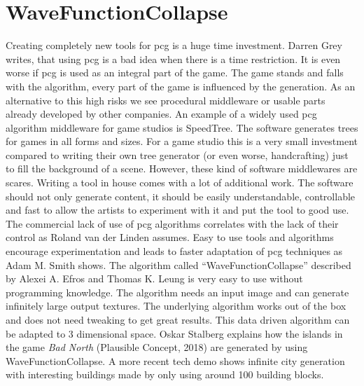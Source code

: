 \documentclass[10pt,a4paper]{article}
\begin{document}
\section{WaveFunctionCollapse}
\begin{multicols}{2}
Creating completely new tools for \gls{pcg} is a huge time investment. Darren Grey writes, that using \gls{pcg} is a bad idea when there is a time restriction\citep[p.~6]{Short:2017:PGG:3161477}. It is even worse if \gls{pcg} is used as an integral part of the game. The game stands and falls with the algorithm, every part of the game is influenced by the generation. As an alternative to this high risks we see procedural middleware or usable parts already developed by other companies. An example of a widely used \gls{pcg} algorithm middleware for game studios is SpeedTree\cite{SpeedTree}. The software generates trees for games in all forms and sizes. For a game studio this is a very small investment compared to writing their own tree generator (or even worse, handcrafting) just to fill the background of a scene. However, these kind of software middlewares are scares. Writing a tool in house comes with a lot of additional work. The software should not only generate content, it should be easily understandable, controllable and fast to allow the artists to experiment with it and put the tool to good use. The commercial lack of use of \gls{pcg} algorithms correlates with the lack of their control as Roland van der Linden assumes\cite{VanderLinden2014}. Easy to use tools and algorithms encourage experimentation and leads to faster adaptation of \gls{pcg} techniques as Adam M. Smith shows\cite{Karth2017}. The algorithm called “WaveFunctionCollapse” described by Alexei A. Efros and Thomas K. Leung is very easy to use without programming knowledge\cite{Efros1999}. The algorithm needs an input image and can generate infinitely large output textures. The underlying algorithm works out of the box and does not need tweaking to get great results. This data driven algorithm can be adapted to 3 dimensional space. Oskar Stalberg explains how the islands in the game \textit{Bad North} (Plausible Concept, 2018) are generated by using WaveFunctionCollapse. A more recent tech demo shows infinite city generation with interesting buildings made by only using around 100 building blocks\cite{Marian2019}.
\end{multicols}
\end{document}
